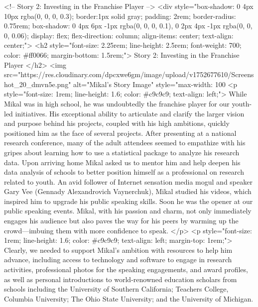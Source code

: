             <!-- Story 2: Investing in the Franchise Player -->
            <div style="box-shadow: 0 4px 10px rgba(0, 0, 0, 0.3); border:1px solid gray;  padding: 2rem; border-radius: 0.75rem; box-shadow: 0 4px 6px -1px rgba(0, 0, 0, 0.1), 0 2px 4px -1px rgba(0, 0, 0, 0.06); display: flex; flex-direction: column; align-items: center; text-align: center;">
                <h2 style="font-size: 2.25rem; line-height: 2.5rem; font-weight: 700; color: #ff0066; margin-bottom: 1.5rem;">
                    Story 2: Investing in the Franchise Player
                </h2>
                <img src="https://res.cloudinary.com/dpcxwe6gm/image/upload/v1752677610/Screenshot_20_dmvn5e.png" alt="Mikal's Story Image" style="max-width: 100%
                <p style="font-size: 1rem; line-height: 1.6; color: #c9c9c9; text-align: left;">
                    While Mikal was in high school, he was undoubtedly the franchise player for our youth-led initiatives. His exceptional ability to articulate and clarify the larger vision and purpose behind his projects, coupled with his high ambitions, quickly positioned him as the face of several projects. After presenting at a national research conference, many of the adult attendees seemed to empathize with his gripes about learning how to use a statistical package to analyze his research data. Upon arriving home Mikal asked us to mentor him and help deepen his data analysis of schools to better position himself as a professional on research related to youth. An avid follower of Internet sensation media mogul and speaker Gary Vee (Gennady Alexandrovich Vaynerchuk), Mikal studied his videos, which inspired him to upgrade his public speaking skills. Soon he was the opener at our public speaking events. Mikal, with his passion and charm, not only immediately engages his audience but also paves the way for his peers by warming up the crowd—imbuing them with more confidence to speak.
                </p>
                <p style="font-size: 1rem; line-height: 1.6; color: #c9c9c9; text-align: left; margin-top: 1rem;">
                    Clearly, we needed to support Mikal’s ambition with resources to help him advance, including access to technology and software to engage in research activities, professional photos for the speaking engagements, and award profiles, as well as personal introductions to world-renowned education scholars from schools including the University of Southern California; Teachers College, Columbia University; The Ohio State University; and the University of Michigan.
